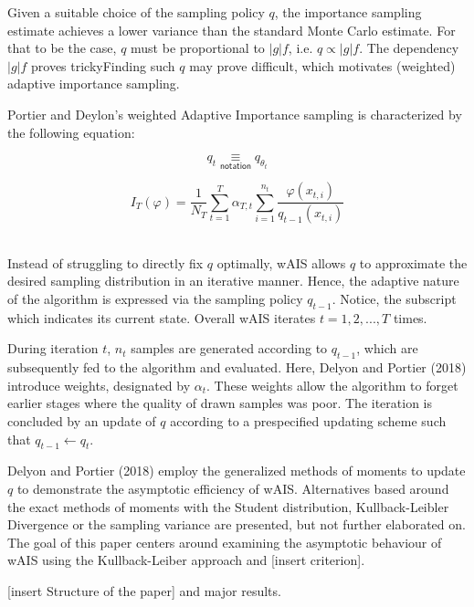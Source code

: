 \bigskip

Given a suitable choice of the sampling policy $q$, the importance sampling estimate achieves a lower variance than the standard Monte Carlo estimate. For that to be the case, $q$ must be proportional to $|g|f$, i.e. $q \displaystyle \propto |g|f$. The dependency $|g|f$ proves trickyFinding such $q$ may prove difficult, which motivates (weighted) adaptive importance sampling.

\bigskip

Portier and Deylon's weighted Adaptive Importance sampling is characterized by the following equation:

$$q_t \underset {\textsf{notation}} \equiv q_{\theta_t}$$

$$\boxed{
I_T(\varphi) = \frac 1 {N_T} \displaystyle\sum\limits_{t=1}^T \alpha_{T,t} \displaystyle\sum\limits_{i = 1}^{n_t} \frac {\varphi(x_{t,i})}{q_{t-1}(x_{t,i})}
}$$ ~\cite{portierdelyonWAIS}

Instead of struggling to directly fix $q$ optimally, wAIS allows $q$ to approximate the desired sampling distribution in an iterative manner. Hence, the adaptive nature of the algorithm is expressed via the sampling policy $q_{t-1}$. Notice, the subscript which indicates its current state. Overall wAIS iterates $t = 1, 2, ...,T$ times. 

During iteration $t$, $n_t$ samples are generated according to $q_{t-1}$, which are subsequently fed to the algorithm and evaluated. Here, Delyon and Portier (2018) introduce weights, designated by $\alpha_t$. These weights allow the algorithm to forget earlier stages where the quality of drawn samples was poor. The iteration is concluded by an update of $q$ according to a prespecified updating scheme such that $q_{t-1} \gets q_t$. 

\bigskip

Delyon and Portier (2018) employ the generalized methods of moments to update $q$ to demonstrate the asymptotic efficiency of wAIS. Alternatives based around the exact methods of moments with the Student distribution, Kullback-Leibler Divergence or the sampling variance are presented, but not further elaborated on. The goal of this paper centers around examining the asymptotic behaviour of wAIS using the Kullback-Leiber approach and [insert criterion]. 

\bigskip

[insert Structure of the paper] and major results.




